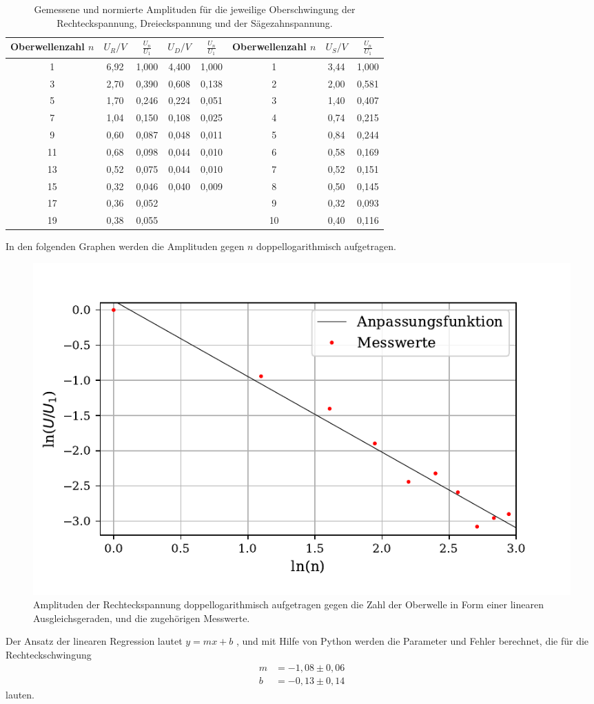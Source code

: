 \begin{table}[H]
  \centering
  \caption{Gemessene und normierte Amplituden für die jeweilige Oberschwingung der Rechteckspannung, Dreieckspannung und der Sägezahnspannung.}
  \label{tab:Rechteckspannung}
  \begin{tabular}{c  | c c | c c | c  | c c }
    \toprule
   Oberwellenzahl $n$ & $U_R/V$ & $\frac{U_n}{U_1}$ & $U_D/V$ & $\frac{U_n}{U_1}$ &Oberwellenzahl $n$ & $U_S/V$ & $\frac{U_n}{U_1}$ \\
    \midrule
    1 & 6,92 & 1,000  &4,400 &  1,000 &1 & 3,44 & 1,000 \\
    3 & 2,70 & 0,390 &0,608 &  0,138 &2 & 2,00 & 0,581 \\
    5 & 1,70 & 0,246 & 0,224 & 0,051 &3 & 1,40 & 0,407 \\
    7 & 1,04 & 0,150 & 0,108 & 0,025 &4 & 0,74 & 0,215 \\
    9 & 0,60 & 0,087 & 0,048 & 0,011 &5 & 0,84 & 0,244 \\
    11 & 0,68 & 0,098 & 0,044 & 0,010 &6 & 0,58 & 0,169 \\
    13 & 0,52 & 0,075& 0,044 & 0,010 &7 & 0,52 & 0,151 \\
    15 & 0,32 & 0,046 & 0,040 & 0,009 &8 & 0,50 & 0,145 \\
    17 & 0,36 & 0,052& & & 9& 0,32 & 0,093 \\
    19 & 0,38 & 0,055& & &10& 0,40 & 0,116 \\
    \bottomrule
  \end{tabular}
\end{table}

\noindent In den folgenden Graphen werden die Amplituden gegen $n$ doppellogarithmisch aufgetragen.

\begin{figure}[H]
  \centering
  \includegraphics{plot1.pdf}
  \caption{Amplituden der Rechteckspannung doppellogarithmisch aufgetragen gegen die Zahl der Oberwelle in Form einer linearen Ausgleichsgeraden, und die zugehörigen Messwerte.}
  \label{fig:rechteck}
\end{figure}
\noindent Der Ansatz der linearen Regression lautet $y = mx + b$ , und mit Hilfe von Python werden die Parameter und Fehler berechnet, die für die Rechteckschwingung
\begin{align*}
  m &= -1,08 \pm 0,06 \\
  b &= -0,13 \pm 0,14 
\end{align*}
lauten.

